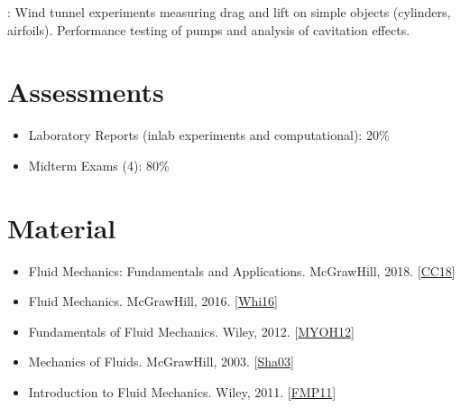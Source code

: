 \documentclass[letterpaper,10pt,english]{jupyterBook}
\begin{document}
\sphinxAtStartPar
{}: Wind tunnel experiments measuring drag and lift on simple objects (cylinders, airfoils). Performance testing of pumps and analysis of cavitation effects.


\section{Assessments}
\label{\detokenize{syllabus:assessments}}\begin{itemize}
\item {} 
\sphinxAtStartPar
Laboratory Reports (in\sphinxhyphen{}lab experiments and computational): 20\%

\item {} 
\sphinxAtStartPar
Midterm Exams (4): 80\%

\end{itemize}


\section{Material}
\label{\detokenize{syllabus:material}}\begin{itemize}
\item {} 
\sphinxAtStartPar
{} Fluid Mechanics: Fundamentals and Applications. McGraw\sphinxhyphen{}Hill, 2018. {[}\hyperlink{cite._sources/markdown:id3}{CC18}{]}

\item {} 
\sphinxAtStartPar
{} Fluid Mechanics. McGraw\sphinxhyphen{}Hill, 2016. {[}\hyperlink{cite._sources/markdown:id4}{Whi16}{]}

\item {} 
\sphinxAtStartPar
{} Fundamentals of Fluid Mechanics. Wiley, 2012. {[}\hyperlink{cite._sources/markdown:id5}{MYOH12}{]}

\item {} 
\sphinxAtStartPar
{} Mechanics of Fluids. McGraw\sphinxhyphen{}Hill, 2003. {[}\hyperlink{cite._sources/markdown:id6}{Sha03}{]}

\item {} 
\sphinxAtStartPar
{} Introduction to Fluid Mechanics. Wiley, 2011. {[}\hyperlink{cite._sources/markdown:id7}{FMP11}{]}

\end{itemize}
\end{document}
